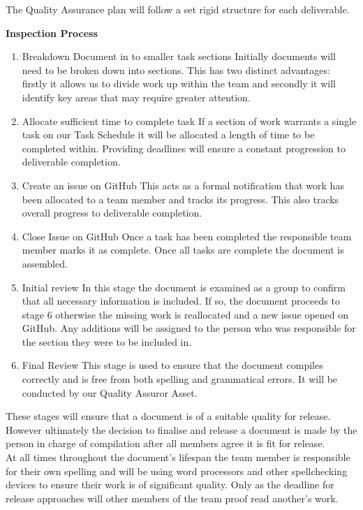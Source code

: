 \documentclass{l3deliverable}
\begin{document}
{The Quality Assurance plan will follow a set rigid structure for each deliverable.

\textbf{Inspection Process}

\begin{enumerate}
\item Breakdown Document in to smaller task sections
Initially documents will need to be broken down into sections. This has two distinct advantages: firstly it allows us to divide work up within the team and secondly it will identify key areas that may require greater attention.

\item Allocate sufficient time to complete task
If a section of work warrants a single task on our Task Schedule it will be allocated a length of time to be completed within. Providing deadlines will ensure a constant progression to deliverable completion.

\item Create an issue on GitHub
This acts as a formal notification that work has been allocated to a team member and tracks its progress. This also tracks overall progress to deliverable completion.

\item Close Issue on GitHub
Once a task has been completed the responsible team member marks it as complete. Once all tasks are complete the document is assembled.

\item Initial review
In this stage the document is examined as a group to confirm that all necessary information is included. If so, the document proceeds to stage 6 otherwise the missing work is reallocated and a new issue opened on GitHub. Any additions will be assigned to the person who was responsible for the section they were to be included in.

\item Final Review
This stage is used to ensure that the document compiles correctly and is free from both spelling and grammatical errors. It will be conducted by our Quality Assuror Asset.
\end{enumerate}

These stages will ensure that a document is of a suitable quality for release. However ultimately the decision to finalise and release a document is made by the person in charge of compilation after all members agree it is fit for release.\\

At all times throughout the document's lifespan the team member is responsible for their own spelling and will be using word processors and other spellchecking devices to ensure their work is of significant quality. Only as the deadline for release approaches will other members of the team proof read another's work.

}
\end{document}
